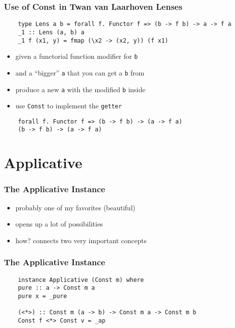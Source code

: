 \documentclass[aspectratio=169]{beamer}
\begin{document}
\begin{frame}[fragile]
  \frametitle{Use of Const in Twan van Laarhoven Lenses}
  \begin{verbatim}
    type Lens a b = forall f. Functor f => (b -> f b) -> a -> f a
    _1 :: Lens (a, b) a
    _1 f (x1, y) = fmap (\x2 -> (x2, y)) (f x1)
  \end{verbatim}

  \begin{itemize}
  \item given a functorial function modifier for \texttt{b}
  \item and a ``bigger'' \texttt{a} that you can get a \texttt{b} from
  \item produce a new \texttt{a} with the modified \texttt{b} inside
  \item use \texttt{Const} to implement the \texttt{getter}
  \end{itemize}

  \begin{verbatim}
    forall f. Functor f => (b -> f b) -> (a -> f a)
    (b -> f b) -> (a -> f a)
  \end{verbatim}

\end{frame}

\section{Applicative}

\begin{frame}
  \frametitle{The Applicative Instance}
  \begin{itemize}
  \item probably one of my favorites (beautiful)
  \item opens up a lot of possibilities
  \item how? connects two very important concepts
  \end{itemize}
\end{frame}

\begin{frame}[fragile]
  \frametitle{The Applicative Instance}
  \begin{verbatim}
    instance Applicative (Const m) where
    pure :: a -> Const m a
    pure x = _pure

    (<*>) :: Const m (a -> b) -> Const m a -> Const m b
    Const f <*> Const v = _ap
  \end{verbatim}
\end{frame}
\end{document}
